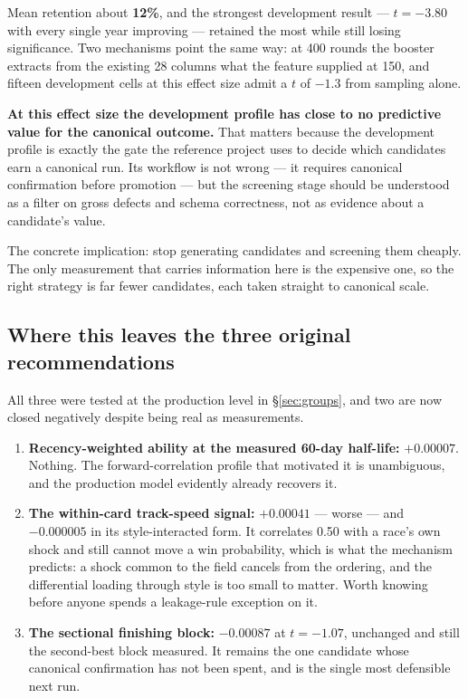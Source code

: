 \documentclass[11pt,a4paper]{article}
\newcommand{\bad}[1]{\textcolor{warm}{\textbf{#1}}}
\begin{document}
Mean retention about \bad{12\%}, and the strongest development result --- $t=-3.80$
with every single year improving --- retained the most while still losing
significance. Two mechanisms point the same way: at 400 rounds the booster extracts
from the existing 28 columns what the feature supplied at 150, and fifteen
development cells at this effect size admit a $t$ of $-1.3$ from sampling alone.

\textbf{At this effect size the development profile has close to no predictive value
for the canonical outcome.} That matters because the development profile is exactly
the gate the reference project uses to decide which candidates earn a canonical run.
Its workflow is not wrong --- it requires canonical confirmation before promotion ---
but the screening stage should be understood as a filter on gross defects and schema
correctness, not as evidence about a candidate's value.

The concrete implication: stop generating candidates and screening them cheaply. The
only measurement that carries information here is the expensive one, so the right
strategy is far fewer candidates, each taken straight to canonical scale.

\subsection*{Where this leaves the three original recommendations}

All three were tested at the production level in \S\ref{sec:groups}, and two are
now closed negatively despite being real as measurements.

\begin{enumerate}\itemsep2pt
\item \textbf{Recency-weighted ability at the measured 60-day half-life:}
$+0.00007$. Nothing. The forward-correlation profile that motivated it is
unambiguous, and the production model evidently already recovers it.
\item \textbf{The within-card track-speed signal:} $+0.00041$ --- worse --- and
$-0.000005$ in its style-interacted form. It correlates 0.50 with a race's own
shock and still cannot move a win probability, which is what the mechanism
predicts: a shock common to the field cancels from the ordering, and the
differential loading through style is too small to matter. Worth knowing before
anyone spends a leakage-rule exception on it.
\item \textbf{The sectional finishing block:} $-0.00087$ at $t=-1.07$, unchanged
and still the second-best block measured. It remains the one candidate whose
canonical confirmation has not been spent, and is the single most defensible next
run.
\end{enumerate}
\end{document}
